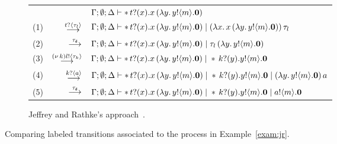 \begin{example}
\begin{figure}
\bigskip

\begin{subfigure}[t]{\textwidth}
		\begin{tabular}{rrl}
		 & & $\Gamma; \emptyset; \Delta \vdash \ast\,{} t ? (x) . x\, {(}\lambda y.\,y ! \langle m \rangle . \mathbf{0}) $
		 \\
		(1) &$\stackrel{t ? \langle \tau_l \rangle}{\longrightarrow}$& $\Gamma; \emptyset; \Delta \vdash \ast\,{} t ? (x) . x\, {(}\lambda y.\,y ! \langle m \rangle . \mathbf{0}) \;|\; (\lambda x.\,x\, {(}\lambda y.\,y ! \langle m \rangle . \mathbf{0}))\, {\tau_l}$\\
		(2) &$\stackrel{\tau_{\mathsf{d}}}{\longrightarrow}$& $\Gamma; \emptyset; \Delta \vdash \ast\,{} t ? (x) . x\, {(}\lambda y.\,y ! \langle m \rangle . \mathbf{0}) \;|\; \tau_l\, {(\lambda y.\,y ! \langle m \rangle . \mathbf{0})}$\\
		(3) &$\stackrel{(\nu\, k) l ! \langle \tau_k \rangle}{\longrightarrow}$& $\Gamma; \emptyset; \Delta \vdash \ast\,{} t ? (x) . x\, {(}\lambda y.\,y ! \langle m \rangle . \mathbf{0}) \;|\; \ast\,{} k ? (y) . y ! \langle m \rangle . \mathbf{0} $\\
		(4) &$\stackrel{k ? \langle a \rangle}{\longrightarrow}$& $\Gamma; \emptyset; \Delta \vdash \ast\,{} t ? (x) . x\, {(}\lambda y.\,y ! \langle m \rangle . \mathbf{0}) \;|\; \ast\,{} k ? (y) . y ! \langle m \rangle . \mathbf{0} \;|\; (\lambda y.\,y ! \langle m \rangle . \mathbf{0})\, {a}$\\
		(5) &$\stackrel{\tau_{\mathsf{d}}}{\longrightarrow}$& $\Gamma; \emptyset; \Delta \vdash \ast\,{} t ? (x) . x\, {(}\lambda y.\,y ! \langle m \rangle . \mathbf{0}) \;|\; \ast\,{} k ? (y) . y ! \langle m \rangle . \mathbf{0} \;|\; a ! \langle m \rangle . \mathbf{0}$
	\end{tabular}
\caption{Jeffrey and Rathke's approach~\cite{JeffreyR05}.}\label{tablejr:2}
	\end{subfigure}
\caption{Comparing labeled transitions associated to the process in Example~\ref{exam:jr}.\label{f:comparison} }
\end{figure}


\end{example}
